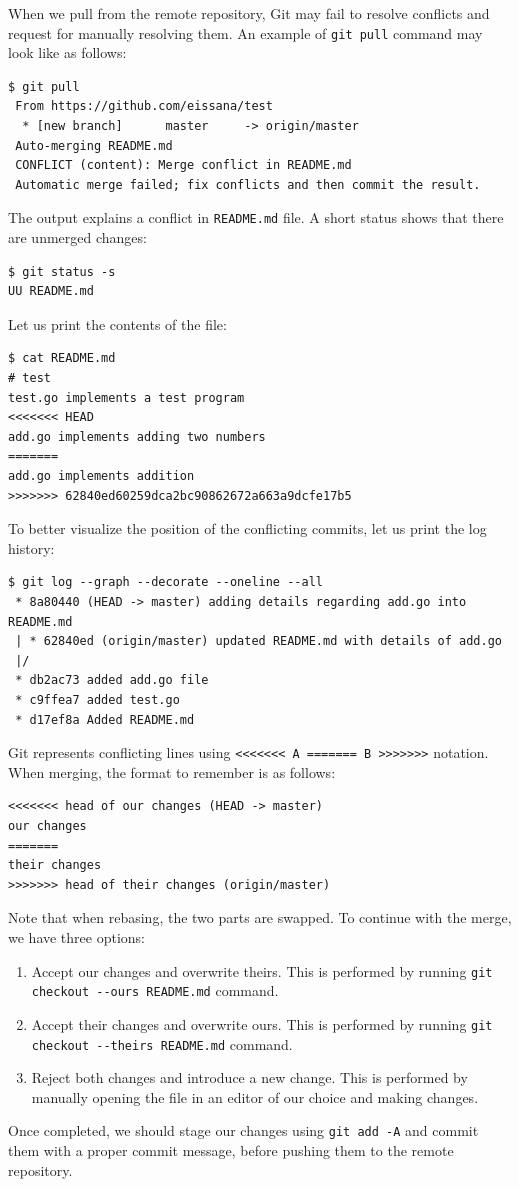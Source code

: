\documentclass[11pt]{article}
\begin{document}
When we pull from the remote repository, Git may fail to resolve conflicts and request for manually resolving them. An example of \texttt{git pull} command may look like as follows:
\begin{verbatim}
$ git pull
 From https://github.com/eissana/test
  * [new branch]      master     -> origin/master
 Auto-merging README.md
 CONFLICT (content): Merge conflict in README.md
 Automatic merge failed; fix conflicts and then commit the result.
\end{verbatim}
The output explains a conflict in \texttt{README.md} file. A short status shows that there are unmerged changes:
\begin{verbatim}
$ git status -s
UU README.md
\end{verbatim}
Let us print the contents of the file:
\begin{verbatim}
$ cat README.md
# test
test.go implements a test program
<<<<<<< HEAD
add.go implements adding two numbers
=======
add.go implements addition
>>>>>>> 62840ed60259dca2bc90862672a663a9dcfe17b5
\end{verbatim}
To better visualize the position of the conflicting commits, let us print the log history:
\begin{verbatim}
$ git log --graph --decorate --oneline --all
 * 8a80440 (HEAD -> master) adding details regarding add.go into README.md
 | * 62840ed (origin/master) updated README.md with details of add.go
 |/
 * db2ac73 added add.go file
 * c9ffea7 added test.go
 * d17ef8a Added README.md
\end{verbatim}
Git represents conflicting lines using \texttt{<<<<<<< A ======= B >>>>>>>} notation. When merging, the format to remember is as follows:
\begin{verbatim}
<<<<<<< head of our changes (HEAD -> master)
our changes
=======
their changes
>>>>>>> head of their changes (origin/master)
\end{verbatim}
Note that when rebasing, the two parts are swapped. To continue with the merge, we have three options:
\begin{enumerate}
\item Accept our changes and overwrite theirs. This is performed by running \texttt{git checkout -{}-ours README.md} command.
\item Accept their changes and overwrite ours. This is performed by running \texttt{git checkout -{}-theirs README.md} command.
\item Reject both changes and introduce a new change. This is performed by manually opening the file in an editor of our choice and making changes.
\end{enumerate}
Once completed, we should stage our changes using \texttt{git add -A} and commit them with a proper commit message, before pushing them to the remote repository.
\end{document}
